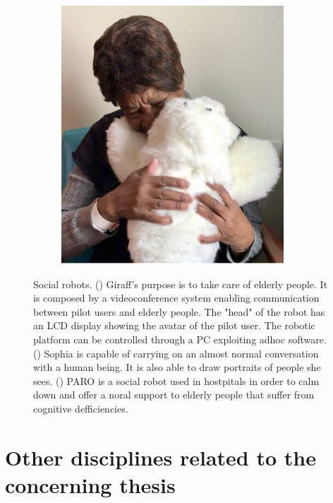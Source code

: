 \documentclass[runningheads,a4paper,12pt]{report}
\begin{document}
\begin{figure}
\begin{subfigure}{.4\textwidth}
  	\includegraphics[width=\linewidth]{./images/1_paro}\hfill
  	\caption{}
  	\label{fig:paro}
  \end{subfigure}\par\medskip
  
    \caption{Social robots. 
    () Giraff's purpose is to take care of elderly people. It is composed by a videoconference system enabling communication between pilot users and elderly people. The "head" of the robot has an LCD display showing the avatar of the pilot user. The robotic platform can be controlled through a PC exploiting ad­hoc software. \cite{giraff}
    () Sophia is capable of carrying on an almost normal conversation with a human being. It is also able to draw portraits of people she sees. \cite{sophia}  
    () PARO is a social robot used in hostpitals in order to calm down and offer a noral support to elderly people that suffer from cognitive defficiencies. \cite{paro} 
    }
    \label{fig:social-robots-fields}
\end{figure} 

\section{Other disciplines related to the concerning thesis}
\end{document}
